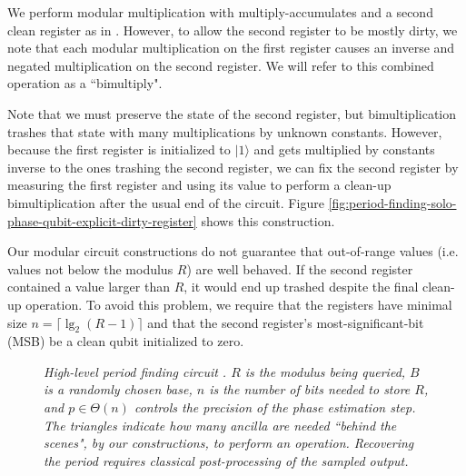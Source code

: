 \documentclass[twocolumn]{article}
\begin{document}
We perform modular multiplication with multiply-accumulates and a second clean register as in \cite{beauregard2003}.
However, to allow the second register to be mostly dirty, we note that each modular multiplication on the first register causes an inverse and negated multiplication on the second register.
We will refer to this combined operation as a ``bimultiply".

Note that we must preserve the state of the second register, but bimultiplication trashes that state with many multiplications by unknown constants.
However, because the first register is initialized to $|1\rangle$ and gets multiplied by constants inverse to the ones trashing the second register, we can fix the second register by measuring the first register and using its value to perform a clean-up bimultiplication after the usual end of the circuit.
Figure \ref{fig:period-finding-solo-phase-qubit-explicit-dirty-register} shows this construction.

Our modular circuit constructions do not guarantee that out-of-range values (i.e. values not below the modulus $R$) are well behaved.
If the second register contained a value larger than $R$, it would end up trashed despite the final clean-up operation.
To avoid this problem, we require that the registers have minimal size $n = \lceil \lg_2(R-1) \rceil$ and that the second register's most-significant-bit (MSB) be a clean qubit initialized to zero.

\begin{figure}
  \centering
  \caption{\em
	High-level period finding circuit \cite{Shor1999}.
	$R$ is the modulus being queried, $B$ is a randomly chosen base, $n$ is the number of bits needed to store $R$, and $p \in \Theta(n)$ controls the precision of the phase estimation step.
    The triangles indicate how many ancilla are needed ``behind the scenes", by our constructions, to perform an operation.
	Recovering the period requires classical post-processing of the sampled output.
  }
  \label{fig:period-finding}
\end{figure}
\end{document}
